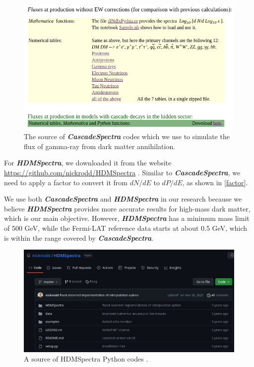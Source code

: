 \documentclass[10pt, oneside]{book}
\numberwithin{equation}{chapter}
\begin{document}
\begin{figure}
	\centering
	\includegraphics[width=0.75\linewidth]{images/PPPC4DMID.png}
	\caption{The source of \textbf{\textit{CascadeSpectra}} codes \cite{Marco_Cirelli_2011} which we use to simulate the flux of gamma-ray from dark matter annihilation.}
	\label{PPPC4DMID}
\end{figure}

For \textbf{\textit{HDMSpectra}}, we downloaded it from the website \url{https://github.com/nickrodd/HDMSpectra} \cite{Bauer_2021}. Similar to \textbf{\textit{CascadeSpectra}}, we need to apply a factor to convert it from $dN/dE$ to $dP/dE$, as shown in \autoref{factor}.

We use both \textbf{\textit{CascadeSpectra}} and \textbf{\textit{HDMSpectra}} in our research because we believe \textbf{\textit{HDMSpectra}} provides more accurate results for high-mass dark matter, which is our main objective. However, \textbf{\textit{HDMSpectra}} has a minimum mass limit of 500 GeV, while the Fermi-LAT reference data starts at about 0.5 GeV, which is within the range covered by \textbf{\textit{CascadeSpectra}}.

\begin{figure}
    \centering
    \includegraphics[width=0.75\linewidth]{images/HDMSpectra_source.png}
    \caption{A source of HDMSpectra Python codes \cite{Bauer_2021}.}
    \label{HDMSpectra-source}
\end{figure}
\end{document}
